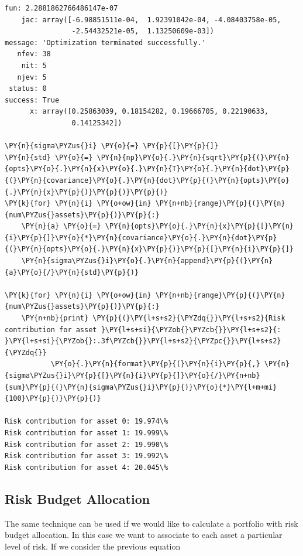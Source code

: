 \begin{codebox}
\begin{Verbatim}[commandchars=\\\{\}]
    fun: 2.2881862766486147e-07
    jac: array([-6.98851511e-04,  1.92391042e-04, -4.08403758e-05, 
                -2.54432521e-05,  1.13250609e-03])
message: 'Optimization terminated successfully.'
   nfev: 38
    nit: 5
   njev: 5
 status: 0
success: True
      x: array([0.25863039, 0.18154282, 0.19666705, 0.22190633, 
                0.14125342])

\PY{n}{sigma\PYZus{}i} \PY{o}{=} \PY{p}{[}\PY{p}{]}
\PY{n}{std} \PY{o}{=} \PY{n}{np}\PY{o}{.}\PY{n}{sqrt}\PY{p}{(}\PY{n}{opts}\PY{o}{.}\PY{n}{x}\PY{o}{.}\PY{n}{T}\PY{o}{.}\PY{n}{dot}\PY{p}{(}\PY{n}{covariance}\PY{o}{.}\PY{n}{dot}\PY{p}{(}\PY{n}{opts}\PY{o}{.}\PY{n}{x}\PY{p}{)}\PY{p}{)}\PY{p}{)} 
\PY{k}{for} \PY{n}{i} \PY{o+ow}{in} \PY{n+nb}{range}\PY{p}{(}\PY{n}{num\PYZus{}assets}\PY{p}{)}\PY{p}{:}
    \PY{n}{a} \PY{o}{=} \PY{n}{opts}\PY{o}{.}\PY{n}{x}\PY{p}{[}\PY{n}{i}\PY{p}{]}\PY{o}{*}\PY{n}{covariance}\PY{o}{.}\PY{n}{dot}\PY{p}{(}\PY{n}{opts}\PY{o}{.}\PY{n}{x}\PY{p}{)}\PY{p}{[}\PY{n}{i}\PY{p}{]} 
    \PY{n}{sigma\PYZus{}i}\PY{o}{.}\PY{n}{append}\PY{p}{(}\PY{n}{a}\PY{o}{/}\PY{n}{std}\PY{p}{)}
		
\PY{k}{for} \PY{n}{i} \PY{o+ow}{in} \PY{n+nb}{range}\PY{p}{(}\PY{n}{num\PYZus{}assets}\PY{p}{)}\PY{p}{:}
    \PY{n+nb}{print} \PY{p}{(}\PY{l+s+s2}{\PYZdq{}}\PY{l+s+s2}{Risk contribution for asset }\PY{l+s+si}{\PYZob{}\PYZcb{}}\PY{l+s+s2}{: }\PY{l+s+si}{\PYZob{}:.3f\PYZcb{}}\PY{l+s+s2}{\PYZpc{}}\PY{l+s+s2}{\PYZdq{}}
           \PY{o}{.}\PY{n}{format}\PY{p}{(}\PY{n}{i}\PY{p}{,} \PY{n}{sigma\PYZus{}i}\PY{p}{[}\PY{n}{i}\PY{p}{]}\PY{o}{/}\PY{n+nb}{sum}\PY{p}{(}\PY{n}{sigma\PYZus{}i}\PY{p}{)}\PY{o}{*}\PY{l+m+mi}{100}\PY{p}{)}\PY{p}{)}

Risk contribution for asset 0: 19.974\%
Risk contribution for asset 1: 19.999\%
Risk contribution for asset 2: 19.990\%
Risk contribution for asset 3: 19.992\%
Risk contribution for asset 4: 20.045\%
\end{Verbatim}
\end{codebox}


\subsection{Risk Budget Allocation}
\label{risk-budget-allocation}

The same technique can be used if we would like to calculate a portfolio
with risk budget allocation. In this case we want to associate to each asset a particular level of risk. If we consider the previous equation


